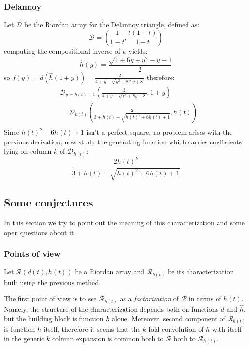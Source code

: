 \documentclass[11pt,a4paper]{article} %
\begin{document}
    \subsubsection{Delannoy}

    Let $\mathcal{D}$ be the Riordan array for the Delannoy triangle, defined as:
    \begin{displaymath} 
        \mathcal{D} =\left( \frac{1}{1-t}, \frac{t(1+t)}{1-t}  \right)
    \end{displaymath} 
    computing the compositional inverse of $h$ yields:
    \begin{displaymath} 
        \hat{h}(y) = \frac{\sqrt{1+6y+y^2}-y-1}{2}
    \end{displaymath} 
    so $f(y)=d(\hat{h}(1+y))=\frac{2}{4 + y - \sqrt{y^2 + 8*y + 8} }$ therefore:
    \begin{displaymath} 
        \begin{split}
            & \mathcal{D}_{y=h(t)-1}\left( \frac{2}{4+y-\sqrt{y^2+8y+8}}, 1+y \right)\\
            &= \mathcal{D}_{h(t)}\left( \frac{2}{3+h(t)-\sqrt{h(t)^2+6h(t)+1}}, h(t) \right) \\
        \end{split}
    \end{displaymath} 
    Since $h(t)^2+6h(t)+1$ isn't a perfect square, no problem arises with the previous
    derivation; now study the generating function which carries coefficients lying on column $k$
    of $\mathcal{D}_{h(t)}$:
    \begin{displaymath} 
        \frac{2h(t)^k}{3+h(t)-\sqrt{h(t)^2+6h(t)+1}}
    \end{displaymath} 

    \subsection{Some conjectures}

    In this section we try to point out the meaning of this characterization
    and some open questions about it.

    \subsubsection{Points of view}

    Let $\mathcal{R}\left(d(t),h(t)\right)$ be a Riordan array and $\mathcal{R}_{h(t)}$ be
    its characterization built using the previous method.
    
    The first point of view is to see $\mathcal{R}_{h(t)}$ as a \emph{factorization}
    of $\mathcal{R}$ in terms of $h(t)$. Namely, the structure of the characterization
    depends both on functions $d$ and $\hat{h}$, but the building block is function $h$
    alone. Moreover, second component of $\mathcal{R}_{h(t)}$ is function $h$ itself,
    therefore it seems that the $k$-fold convolution of $h$ with itself in the generic
    $k$ column expansion is common both to $\mathcal{R}$ both to $\mathcal{R}_{h(t)}$.
\end{document}
